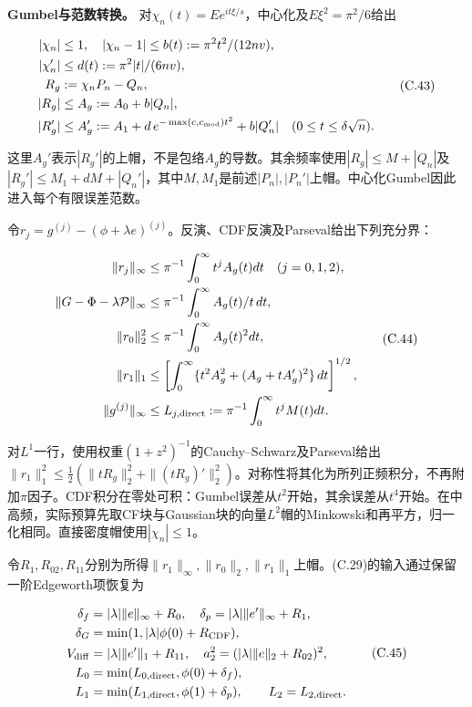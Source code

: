 \documentclass[11pt,a4paper]{article}
\begin{document}
\textbf{Gumbel与范数转换。}
对\(\chi_n(t)=Ee^{it\xi/s}\)，中心化及\(E\xi^2=\pi^2/6\)给出

\[
\begin{aligned}
|\chi_n|&\le1,\quad |\chi_n-1|\le b(t):=\pi^2t^2/(12nv),\\
|\chi_n'|&\le d(t):=\pi^2|t|/(6nv),\\
R_g&:=\chi_nP_n-Q_n,\\
|R_g|&\le A_g:=A_0+b|Q_n|,\\
|R_g'|&\le A_g':=A_1+d\,e^{-\max(c,c_{\rm mod})t^2}+b|Q_n'|
\quad(0\le t\le\delta\sqrt n).
\end{aligned}
\tag{C.43}
\]

这里\(A_g'\)表示\(|R_g'|\)的上帽，不是包络\(A_g\)的导数。其余频率使用\(|R_g|\le M+|Q_n|\)及\(|R_g'|\le M_1+dM+|Q_n'|\)，其中\(M,M_1\)是前述\(|P_n|,|P_n'|\)上帽。中心化Gumbel因此进入每个有限误差范数。

令\(r_j=g^{(j)}-(\phi+\lambda e)^{(j)}\)。反演、CDF反演及Parseval给出下列充分界：

\[
\begin{aligned}
\|r_j\|_\infty&\le\pi^{-1}\int_0^\infty t^jA_g(t)dt\quad(j=0,1,2),\\
\|G-\Phi-\lambda\mathcal P\|_\infty&\le\pi^{-1}\int_0^\infty A_g(t)/t\,dt,\\
\|r_0\|_2^2&\le\pi^{-1}\int_0^\infty A_g(t)^2dt,\\
\|r_1\|_1&\le\left[\int_0^\infty\{t^2A_g^2+(A_g+tA_g')^2\}\,dt\right]^{1/2},\\
\|g^{(j)}\|_\infty&\le L_{j,\rm direct}:=\pi^{-1}\int_0^\infty t^jM(t)dt.
\end{aligned}
\tag{C.44}
\]

对\(L^1\)一行，使用权重\((1+z^2)^{-1}\)的Cauchy--Schwarz及Parseval给出\(\|r_1\|_1^2\le\tfrac12(\|tR_g\|_2^2+\|(tR_g)'\|_2^2)\)。对称性将其化为所列正频积分，不再附加\(\pi\)因子。CDF积分在零处可积：Gumbel误差从\(t^2\)开始，其余误差从\(t^4\)开始。在中高频，实际预算先取CF块与Gaussian块的向量\(L^2\)帽的Minkowski和再平方，归一化相同。直接密度帽使用\(|\chi_n|\le1\)。

令\(R_1,R_{02},R_{11}\)分别为所得\(\|r_1\|_\infty,\|r_0\|_2,\|r_1\|_1\)上帽。(C.29)的输入通过保留一阶Edgeworth项恢复为

\[
\begin{aligned}
\delta_f&=|\lambda|\|e\|_\infty+R_0,\quad
\delta_p=|\lambda|\|e'\|_\infty+R_1,\\
\delta_G&=\min(1,|\lambda|\phi(0)+R_{\rm CDF}),\\
V_{\rm diff}&=|\lambda|\|e'\|_1+R_{11},\quad
 a_2^2=(|\lambda|\|e\|_2+R_{02})^2,\\
L_0&=\min(L_{0,\rm direct},\phi(0)+\delta_f),\\
L_1&=\min(L_{1,\rm direct},\phi(1)+\delta_p),\qquad L_2=L_{2,\rm direct}.
\end{aligned}
\tag{C.45}
\]
\end{document}
